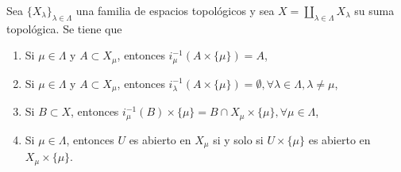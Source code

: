 

\begin{proposition}
Sea $\{ X_{\lambda} \}_{\lambda \in \Lambda}$ una familia de espacios topológicos y sea $X = \coprod_{\lambda \in \Lambda} X_{\lambda}$ su suma topológica. Se tiene que
\begin{enumerate}[label=\textnormal{(\roman*)}]
\item Si $\mu \in \Lambda$ y $A \subset X_{\mu}$, entonces $i^{-1}_{\mu}(A \times \{ \mu \}) = A$,
\item Si $\mu \in \Lambda$ y $A \subset X_{\mu}$, entonces $i^{-1}_{\lambda}(A \times \{ \mu \}) = \emptyset, \forall \lambda \in \Lambda, \lambda \ne \mu$,
\item Si $B \subset X$, entonces $i^{-1}_{\mu}(B) \times \{ \mu \} = B \cap X_{\mu} \times \{ \mu \}, \forall \mu \in \Lambda$,
\item Si $\mu \in \Lambda$, entonces $U$ es abierto en $X_{\mu}$ si y solo si $U \times \{ \mu \}$ es abierto en $X_{\mu} \times \{ \mu \}$.
\end{enumerate}
\end{proposition}

